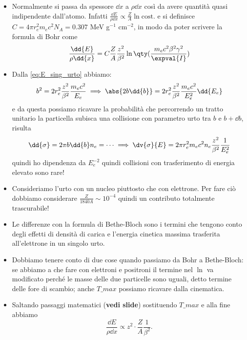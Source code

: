 \begin{itemize}
    \item Normalmente si passa da spessore $\dd x$ a $\rho\dd x$ così da avere quantità quasi indipendente dall'atomo. Infatti $\frac{\dd{E}}{\rho\dd{x}}\propto \frac Z A \ln \text{cost.}$ e si definisce $C=4\pi r_e^2 m_ec^2N_A=0.307$ MeV g$^{-1}$ cm$^{-2}$, in modo da poter scrivere la formula di Bohr come
    \begin{equation*}
        \frac{\dd{E}}{\rho\dd{x}}=C\frac{Z}{A}\frac{z^2}{\beta^2}\ln\qty(\frac{m_ec^2\beta^2\gamma^2}{\expval{I}})
    \end{equation*}
    \item Dalla \autoref{eq:E_sing_urto} abbiamo:
    \begin{equation*}
        b^2=2r_e^2\frac{z^2}{\beta^2}\frac{m_ec^2}{E_e}\implies \abs{2b\dd {b}}=2r_e^2\frac{z^2}{\beta^2}\frac{m_ec^2}{E_e^2}\dd{E_e}
    \end{equation*}
    e da questa possiamo ricavare la probabilità che percorrendo un tratto unitario la particella subisca una collisione con parametro urto tra $b$ e $b+\dd{b}$, risulta
    \begin{equation*}
        \dd{\sigma}=2\pi b\dd{b}n_e = \dots\implies \dv{\sigma}{E}=2\pi r_e^2m_ec^2n_e\frac{z^2}{\beta^2}\frac1{E_e^2}       
    \end{equation*}
    quindi ho dipendenza da $E_e^{-2}$ quindi collisioni con trasferimento di energia elevato sono rare!
    \item Consideriamo l'urto con un nucleo piuttosto che con elettrone. Per fare ciò dobbiamo considerare $\frac{Z}{1840A}\sim 10^{-4}$ quindi un contributo totalmente trascurabile!
    \item Le differenze con la formula di Bethe-Bloch sono i termini che tengono conto degli effetti di densità di carica e l'energia cinetica massima trasferita all'elettrone in un singolo urto.
    \item Dobbiamo tenere conto di due cose quando passiamo da Bohr a Bethe-Bloch: se abbiamo a che fare con elettroni e positroni il termine nel $\ln$ va modificato perché le masse delle due particelle sono uguali, detto termine delle fore di scambio; anche $T\_{max}$ possiamo ricavare dalla cinematica. 
    \item Saltando passaggi matematici (\textbf{vedi slide}) sostituendo $T\_{max}$ e alla fine abbiamo 
    \begin{equation*}
      \frac{\dd E}{\rho \dd{x}}\propto z^2\cdot \frac Z A \frac1{\beta^2}.  
    \end{equation*}

\end{itemize}
